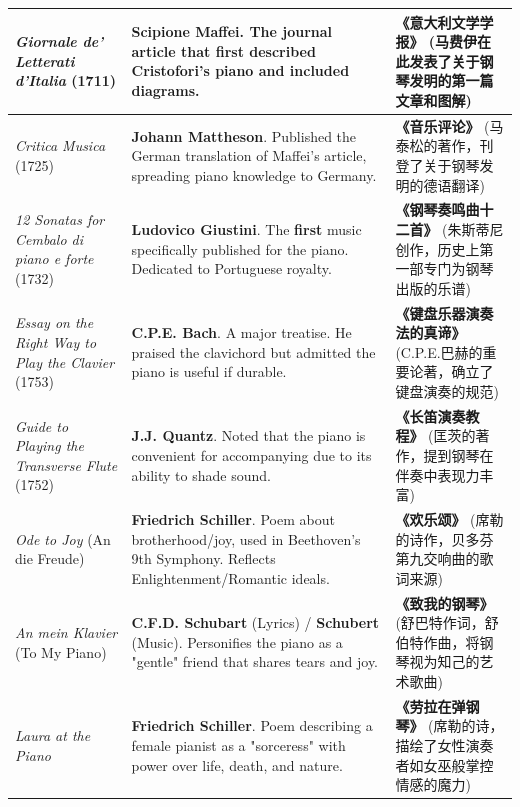 \documentclass[math,code]{amznotes}
\theoremstyle{remark}
\begin{document}
\begin{longtable}{p{} p{} p{}}
\textit{Giornale de' Letterati d'Italia} (1711) & \textbf{Scipione Maffei}. The journal article that first described Cristofori's piano and included diagrams. & \textbf{《意大利文学学报》} (马费伊在此发表了关于钢琴发明的第一篇文章和图解) \\
\midrule
\textit{Critica Musica} (1725) & \textbf{Johann Mattheson}. Published the German translation of Maffei's article, spreading piano knowledge to Germany. & \textbf{《音乐评论》} (马泰松的著作，刊登了关于钢琴发明的德语翻译) \\
\midrule
\textit{12 Sonatas for Cembalo di piano e forte} (1732) & \textbf{Ludovico Giustini}. The \textbf{first} music specifically published for the piano. Dedicated to Portuguese royalty. & \textbf{《钢琴奏鸣曲十二首》} (朱斯蒂尼创作，历史上第一部专门为钢琴出版的乐谱) \\
\midrule
\textit{Essay on the Right Way to Play the Clavier} (1753) & \textbf{C.P.E. Bach}. A major treatise. He praised the clavichord but admitted the piano is useful if durable. & \textbf{《键盘乐器演奏法的真谛》} (C.P.E.巴赫的重要论著，确立了键盘演奏的规范) \\
\midrule
\textit{Guide to Playing the Transverse Flute} (1752) & \textbf{J.J. Quantz}. Noted that the piano is convenient for accompanying due to its ability to shade sound. & \textbf{《长笛演奏教程》} (匡茨的著作，提到钢琴在伴奏中表现力丰富) \\
\midrule
\textit{Ode to Joy} (An die Freude) & \textbf{Friedrich Schiller}. Poem about brotherhood/joy, used in Beethoven's 9th Symphony. Reflects Enlightenment/Romantic ideals. & \textbf{《欢乐颂》} (席勒的诗作，贝多芬第九交响曲的歌词来源) \\
\midrule
\textit{An mein Klavier} (To My Piano) & \textbf{C.F.D. Schubart} (Lyrics) / \textbf{Schubert} (Music). Personifies the piano as a "gentle" friend that shares tears and joy. & \textbf{《致我的钢琴》} (舒巴特作词，舒伯特作曲，将钢琴视为知己的艺术歌曲) \\
\midrule
\textit{Laura at the Piano} & \textbf{Friedrich Schiller}. Poem describing a female pianist as a "sorceress" with power over life, death, and nature. & \textbf{《劳拉在弹钢琴》} (席勒的诗，描绘了女性演奏者如女巫般掌控情感的魔力) \\
\end{longtable}
\end{document}
